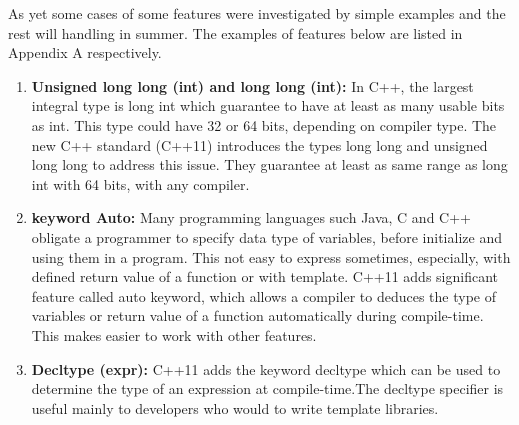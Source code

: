 \documentclass[11pt]{report}
\begin{document}
As yet some cases of some features were investigated by simple examples and the rest will handling in summer. The examples of features below are listed in Appendix A respectively.
 \begin{enumerate}
\item \textbf{Unsigned long long (int) and long long (int):} In C++, the largest integral type is long int which guarantee to have at least as many  usable bits as int. This type could have 32 or 64 bits, depending on compiler type. The new C++ standard (C++11) introduces the types long long and  unsigned long long to address this issue. They guarantee at least as same range as long int with 64 bits, with any compiler\cite{Gregorie:professionalcpp}.

\item \textbf{keyword Auto:} Many programming languages such Java, C and C++ obligate a programmer to specify data type of variables, before initialize  and using them in a program. This not easy to express sometimes, especially, with defined return value of a function or with template. C++11 adds significant feature called auto keyword, which allows a compiler to deduces the type of variables or return value of a function automatically during compile-time. This makes easier to work with other features\cite{Prata:2012:Cpp}.

\item \textbf{Decltype (expr):} C++11 adds the keyword decltype which can be used to determine the type of an expression at compile-time.\linebreak The decltype specifier is useful mainly to developers who would to write template libraries\cite{Gregorie:professionalcpp}.


\end{enumerate}
\end{document}
